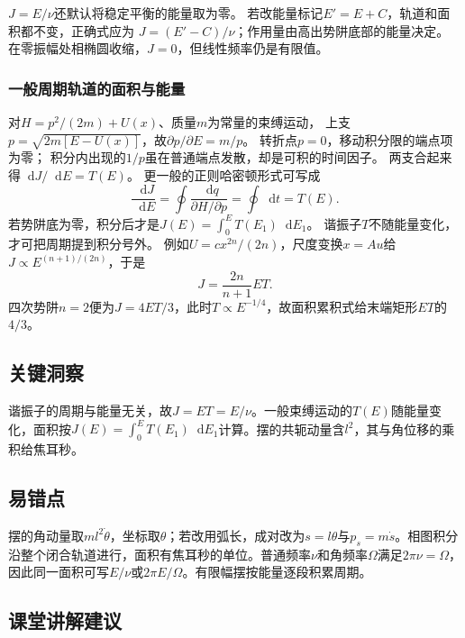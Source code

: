 \documentclass[UTF8,fontset=fandol,a4paper,11pt]{ctexart}
\newcommand{\dd}{\mathop{}\!\mathrm{d}}
\begin{document}
$J=E/\nu$还默认将稳定平衡的能量取为零。
若改能量标记$E'=E+C$，轨道和面积都不变，正确式应为
$J=(E'-C)/\nu$；作用量由高出势阱底部的能量决定。
在零振幅处相椭圆收缩，$J=0$，但线性频率仍是有限值。

\subsubsection*{一般周期轨道的面积与能量}
对$H=p^2/(2m)+U(x)$、质量$m$为常量的束缚运动，
上支$p=\sqrt{2m[E-U(x)]}$，故$\partial p/\partial E=m/p$。
转折点$p=0$，移动积分限的端点项为零；
积分内出现的$1/p$虽在普通端点发散，却是可积的时间因子。
两支合起来得$\dd J/\dd E=T(E)$。
更一般的正则哈密顿形式可写成
\[
\frac{\dd J}{\dd E}=\oint\frac{\dd q}{\partial H/\partial p}
=\oint\dd t=T(E).
\]
若势阱底为零，积分后才是$J(E)=\int_0^E T(E_1)\dd E_1$。
谐振子$T$不随能量变化，才可把周期提到积分号外。
例如$U=cx^{2n}/(2n)$，尺度变换$x=A u$给
$J\propto E^{(n+1)/(2n)}$，于是
\[
J=\frac{2n}{n+1}ET.
\]
四次势阱$n=2$便为$J=4ET/3$，此时$T\propto E^{-1/4}$，故面积累积式给末端矩形$ET$的$4/3$。




\subsection*{关键洞察}

谐振子的周期与能量无关，故$J=ET=E/\nu$。一般束缚运动的$T(E)$随能量变化，面积按$J(E)=\int_0^E T(E_1)\dd E_1$计算。摆的共轭动量含$l^2$，其与角位移的乘积给焦耳秒。




\subsection*{易错点}

摆的角动量取$ml^2\dot\theta$，坐标取$\theta$；若改用弧长，成对改为$s=l\theta$与$p_s=m\dot s$。相图积分沿整个闭合轨道进行，面积有焦耳秒的单位。普通频率$\nu$和角频率$\Omega$满足$2\pi\nu=\Omega$，因此同一面积可写$E/\nu$或$2\pi E/\Omega$。有限幅摆按能量逐段积累周期。




\subsection*{课堂讲解建议}
\end{document}
